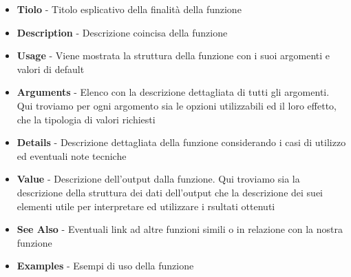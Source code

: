 \documentclass[
]{book}
\providecommand{\tightlist}{%
  \setlength{\itemsep}{0pt}\setlength{\parskip}{0pt}}
\begin{document}
\begin{itemize}
\tightlist
\item
  \textbf{Tiolo} - Titolo esplicativo della finalità della funzione\\
\item
  \textbf{Description} - Descrizione coincisa della funzione
\item
  \textbf{Usage} - Viene mostrata la struttura della funzione con i suoi argomenti e valori di default
\item
  \textbf{Arguments} - Elenco con la descrizione dettagliata di tutti gli argomenti. Qui troviamo per ogni argomento sia le opzioni utilizzabili ed il loro effetto, che la tipologia di valori richiesti
\item
  \textbf{Details} - Descrizione dettagliata della funzione considerando i casi di utilizzo ed eventuali note tecniche
\item
  \textbf{Value} - Descrizione dell'output dalla funzione. Qui troviamo sia la descrizione della struttura dei dati dell'output che la descrizione dei suei elementi utile per interpretare ed utilizzare i rsultati ottenuti
\item
  \textbf{See Also} - Eventuali link ad altre funzioni simili o in relazione con la nostra funzione
\item
  \textbf{Examples} - Esempi di uso della funzione
\end{itemize}
\end{document}
